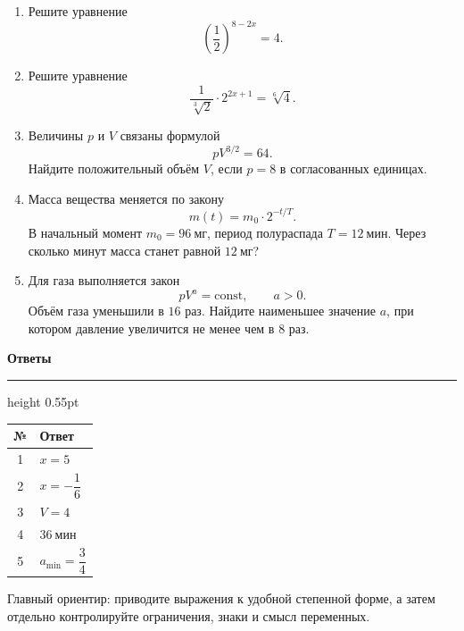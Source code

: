 \documentclass[a4paper,12pt]{article}
\newcommand{\const}{\mathrm{const}}
\newcommand{\lessonsection}[1]{%
  \vspace{0.35em}%
  {\Large\bfseries\color{darkaccent}#1\par}%
  \vspace{0.22em}%
  {\color{accent!55}\hrule height 0.55pt}%
  \vspace{0.6em}%
}
\begin{document}
\begin{enumerate}[label=\textbf{\arabic*.}]

  \item Решите уравнение
  \[
  \left(\frac12\right)^{8-2x}=4.
  \]

  \item Решите уравнение
  \[
  \frac1{\sqrt[3]{2}}\cdot2^{2x+1}=\sqrt[6]{4}.
  \]

  \item Величины $p$ и $V$ связаны формулой
  \[
  pV^{3/2}=64.
  \]
  Найдите положительный объём $V$, если $p=8$ в согласованных единицах.

  \item Масса вещества меняется по закону
  \[
  m(t)=m_0\cdot2^{-t/T}.
  \]
  В начальный момент $m_0=96\ \text{мг}$, период полураспада $T=12\ \text{мин}$. Через сколько минут масса станет равной $12\ \text{мг}$?

  \item Для газа выполняется закон
  \[
  pV^a=\const,
  \qquad a>0.
  \]
  Объём газа уменьшили в $16$ раз. Найдите наименьшее значение $a$, при котором давление увеличится не менее чем в $8$ раз.

\end{enumerate}


\clearpage

\lessonsection{Ответы}

\begin{center}
\renewcommand{\arraystretch}{1.45}
\begin{tabularx}{0.82\linewidth}{@{}c X@{}}
\toprule
\textbf{№} & \textbf{Ответ} \\
\midrule
1 & $x=5$ \\
2 & $x=-\dfrac16$ \\
3 & $V=4$ \\
4 & $36\ \text{мин}$ \\
5 & $a_{\min}=\dfrac34$ \\
\bottomrule
\end{tabularx}
\end{center}

\vfill

{\small\color{softgray}
Главный ориентир: приводите выражения к удобной степенной форме, а затем отдельно контролируйте ограничения, знаки и смысл переменных.
}
\end{document}
